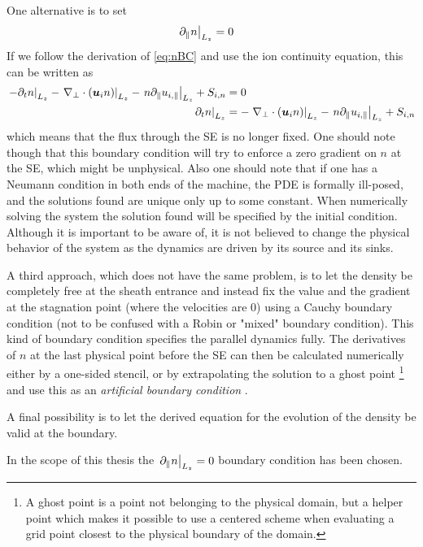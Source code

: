 One alternative is to set
%
\begin{align*}
    \left. \partial_\| n \right|_{L_z} &= 0
\end{align*}
%
If we follow the derivation of \cref{eq:nBC} and use the ion continuity equation, this can be written as
%
\begin{align*}
    \left.- \partial_tn \right|_{L_z}- \left.\nabla_\perp\cdot\left(\boldsymbol{u}_{i} n \right)\right|_{L_z}
    -\left.n \partial_\| u_{i,\|}\right|_{L_z} + S_{i,n}
    &= 0\\
    \left.\partial_tn \right|_{L_z}&=  - \left.\nabla_\perp\cdot\left(\boldsymbol{u}_{i} n \right)\right|_{L_z}-
    \left.n \partial_\| u_{i,\|}\right|_{L_z} + S_{i,n}
\end{align*}
%
which means that the flux through the SE is no longer fixed.
One should note though that this boundary condition will try to enforce a zero gradient on $n$ at the SE, which might be unphysical.
Also one should note that if one has a Neumann condition in both ends of the machine, the PDE is formally ill-posed, and the solutions found are unique only up to some constant.
When numerically solving the system the solution found will be specified by the initial condition.
Although it is important to be aware of, it is not believed to change the physical behavior of the system as the dynamics are driven by its source and its sinks.

A third approach, which does not have the same problem, is to let the density be completely free at the sheath entrance and instead fix the value and the gradient at the stagnation point (where the velocities are $0$) using a Cauchy boundary condition (not to be confused with a Robin or "mixed" boundary condition).
This kind of boundary condition specifies the parallel dynamics fully.
The derivatives of $n$ at the last physical point before the SE can then be calculated numerically either by a one-sided stencil, or by extrapolating the solution to a ghost point%
%
\footnote{A ghost point is a point not belonging to the physical domain, but a helper point which makes it possible to use a centered scheme when evaluating a grid point closest to the physical boundary of the domain.}
%
and use this as an \emph{artificial boundary condition} \cite{Leveque2007book}.

A final possibility is to let the derived equation for the evolution of the density be valid at the boundary.

In the scope of this thesis the $\left. \partial_\| n \right|_{L_z} = 0$ boundary condition has been chosen.


